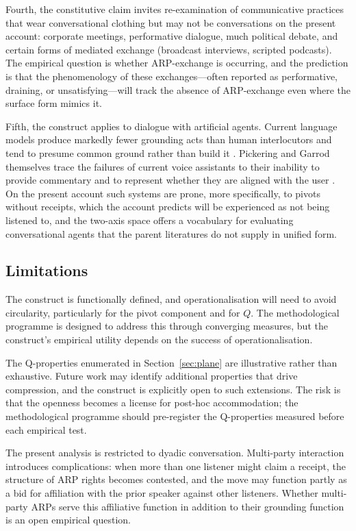 Fourth, the constitutive claim invites re-examination of communicative practices that wear conversational clothing but may not be conversations on the present account: corporate meetings, performative dialogue, much political debate, and certain forms of mediated exchange (broadcast interviews, scripted podcasts). The empirical question is whether ARP-exchange is occurring, and the prediction is that the phenomenology of these exchanges---often reported as performative, draining, or unsatisfying---will track the absence of ARP-exchange even where the surface form mimics it.

Fifth, the construct applies to dialogue with artificial agents. Current language models produce markedly fewer grounding acts than human interlocutors and tend to presume common ground rather than build it \citep{Shaikh2024}. Pickering and Garrod themselves trace the failures of current voice assistants to their inability to provide commentary and to represent whether they are aligned with the user \citep{PickeringGarrod2021}. On the present account such systems are prone, more specifically, to pivots without receipts, which the account predicts will be experienced as not being listened to, and the two-axis space offers a vocabulary for evaluating conversational agents that the parent literatures do not supply in unified form.

\subsection{Limitations}

The construct is functionally defined, and operationalisation will need to avoid circularity, particularly for the pivot component and for $Q$. The methodological programme is designed to address this through converging measures, but the construct's empirical utility depends on the success of operationalisation.

The Q-properties enumerated in Section~\ref{sec:plane} are illustrative rather than exhaustive. Future work may identify additional properties that drive compression, and the construct is explicitly open to such extensions. The risk is that the openness becomes a license for post-hoc accommodation; the methodological programme should pre-register the Q-properties measured before each empirical test.

The present analysis is restricted to dyadic conversation. Multi-party interaction introduces complications: when more than one listener might claim a receipt, the structure of ARP rights becomes contested, and the move may function partly as a bid for affiliation with the prior speaker against other listeners. Whether multi-party ARPs serve this affiliative function in addition to their grounding function is an open empirical question.

